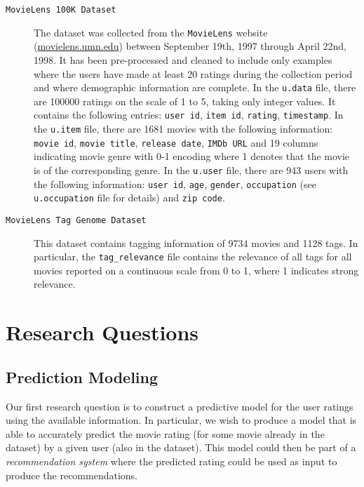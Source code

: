 \documentclass[bj, preprint]{imsart}
\begin{document}
\begin{description}
	\item[\texttt{MovieLens 100K Dataset}] 
	The dataset was collected from the \texttt{MovieLens} website (\url{movielens.umn.edu}) between September 19th, 1997 through April 22nd, 1998. 
	It has been pre-processed and cleaned to include only examples where the users have made at least 20 ratings during the collection period and where demographic information are complete. 
	In the \texttt{u.data} file, there are \num{100000} ratings on the scale of 1 to 5, taking only integer values. 
	It contains the following entries: \texttt{user id}, \texttt{item id}, \texttt{rating}, \texttt{timestamp}. 
	In the \texttt{u.item} file, there are \num{1681} movies with the following information: \texttt{movie id}, \texttt{movie title}, \texttt{release date}, \texttt{IMDb URL} and 19 columns indicating movie genre with 0-1 encoding where 1 denotes that the movie is of the corresponding genre. 
	In the \texttt{u.user} file, there are \num{943} users with the following information: \texttt{user id}, \texttt{age}, \texttt{gender}, \texttt{occupation} (see \texttt{u.occupation} file for details) and \texttt{zip code}.
	\item[\texttt{MovieLens Tag Genome Dataset}] 
	This dataset contains tagging information of \num{9734} movies and \num{1128} tags. 
	In particular, the \texttt{tag\_relevance} file contains the relevance of all tags for all movies reported on a continuous scale from 0 to 1, where 1 indicates strong relevance.
\end{description}


\section{Research Questions}\label{sec:questions}

\subsection{Prediction Modeling}

Our first research question is to construct a predictive model for the user ratings using the available information. 
In particular, we wish to produce a model that is able to accurately predict the movie rating (for some movie already in the dataset) by a given user (also in the dataset). 
This model could then be part of a \textit{recommendation system} where the predicted rating could be used as input to produce the recommendations.
\end{document}
